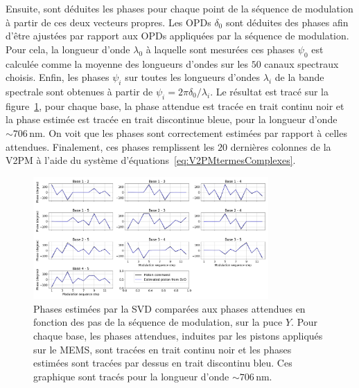 Ensuite, sont déduites les phases pour chaque point de la séquence de modulation à partir de ces deux vecteurs propres. Les \ac{OPD}s $\delta_0$ sont déduites des phases afin d'être ajustées par rapport aux \ac{OPD}s appliquées par la séquence de modulation. Pour cela, la longueur d'onde $\lambda_0$ à laquelle sont mesurées ces phases $\psi_0$ est calculée comme la moyenne des longueurs d'ondes sur les $50$ canaux spectraux choisis. Enfin, les phases $\psi_i$ sur toutes les longueurs d'ondes $\lambda_i$ de la bande spectrale sont obtenues à partir de $\psi_i = 2 \pi \delta_0 / \lambda_i$. Le résultat est tracé sur la figure~\ref{fig:PhaseEstimees}, pour chaque base, la phase attendue est tracée en trait continu noir et la phase estimée est tracée en trait discontinue bleue, pour la longueur d'onde $\sim 706 \,$nm. On voit que les phases sont correctement estimées par rapport à celles attendues. Finalement, ces phases remplissent les $20$ dernières colonnes de la \ac{V2PM} à l'aide du système d'équations~\ref{eq:V2PMtermesComplexes}.

\begin{figure}[ht!]
    \centering
    \includegraphics[width=0.8\textwidth]{Figure_Chap3/20221010_ModSeq_L874_EstPhase830_880_Pola1_Base_LaTex.png}
    \caption[Phases estimées par la SVD comparées aux phases attendues en fonction des pas de la séquence de modulation.]{Phases estimées par la SVD comparées aux phases attendues en fonction des pas de la séquence de modulation, sur la puce $Y$. Pour chaque base, les phases attendues, induites par les pistons appliqués sur le MEMS, sont tracées en trait continu noir et les phases estimées sont tracées par dessus en trait discontinu bleu. Ces graphique sont tracés pour la longueur d'onde $\sim 706 \,$nm.}
    \label{fig:PhaseEstimees}
\end{figure}




